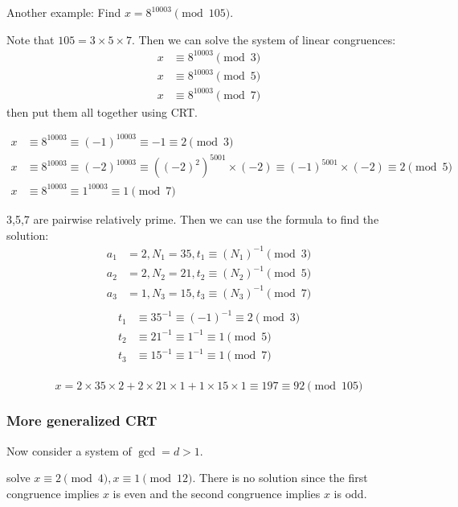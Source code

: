 \documentclass[letterpaper,12pt,oneside]{article}
\begin{document}
Another example: Find $x=8^{10003}\pmod {105}$.

Note that $105=3\times 5\times 7$. Then we can solve the system of linear congruences: \begin{align*}
    x & \equiv 8^{10003} \pmod 3 \\
    x & \equiv 8^{10003} \pmod 5 \\
    x & \equiv 8^{10003} \pmod 7
\end{align*}
then put them all together using CRT. 

\begin{align*}
    x&\equiv 8^{10003} \equiv {(-1)}^{10003} \equiv -1 \equiv 2 \pmod 3 \\
    x&\equiv 8^{10003} \equiv {(-2)}^{10003} \equiv {((-2)^2)}^{5001} \times (-2)\equiv (-1)^{5001}\times (-2) \equiv 2 \pmod 5 \\
    x&\equiv 8^{10003} \equiv 1^{10003} \equiv 1 \pmod 7
\end{align*}

3,5,7 are pairwise relatively prime. Then we can use the formula to find the solution:
\begin{align*}
    a_1 & = 2, N_1 = 35, t_1 \equiv (N_1)^{-1} \pmod 3 \\
    a_2 & = 2, N_2 = 21, t_2 \equiv (N_2)^{-1} \pmod 5 \\
    a_3 & = 1, N_3 = 15, t_3 \equiv (N_3)^{-1} \pmod 7 \\
\end{align*}
\begin{align*}
    t_1 &\equiv 35^{-1} \equiv (-1)^{-1}\equiv 2 \pmod 3 \\
    t_2 &\equiv 21^{-1} \equiv 1^{-1} \equiv 1 \pmod 5 \\
    t_3 &\equiv 15^{-1} \equiv 1^{-1} \equiv 1 \pmod 7 \\
\end{align*}

\[
    x = 2\times 35\times 2 + 2\times 21\times 1 + 1\times 15\times 1 \equiv 197 \equiv 92 \pmod {105}
\]

\subsubsection{More generalized CRT}
Now consider a system of $\gcd = d > 1$.

solve $x\equiv 2 \pmod 4, x\equiv 1 \pmod {12}$. There is no solution since the first congruence implies $x$ is even and the second congruence implies $x$ is odd.
\end{document}

